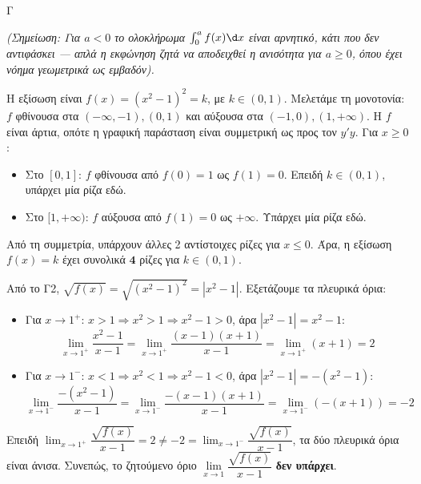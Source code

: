 \begin{thema}{Γ}
\begin{erwthma}
\textit{(Σημείωση: Για $a < 0$ το ολοκλήρωμα $\int_0^a f(x)\d x$ είναι αρνητικό, κάτι που δεν αντιφάσκει — απλά η εκφώνηση ζητά να αποδειχθεί η ανισότητα για $a \ge 0$, όπου έχει νόημα γεωμετρικά ως εμβαδόν).}

\item Η εξίσωση είναι $f(x) = (x^2-1)^2 = k$, με $k \in (0, 1)$.
Μελετάμε τη μονοτονία: $f$ φθίνουσα στα $(-\infty,-1), (0,1)$ και αύξουσα στα $(-1,0), (1,+\infty)$.
Η $f$ είναι άρτια, οπότε η γραφική παράσταση είναι συμμετρική ως προς τον $y'y$.
Για $x \ge 0$:
\begin{itemize}
    \item Στο $[0,1]$: $f$ φθίνουσα από $f(0)=1$ ως $f(1)=0$. Επειδή $k \in (0,1)$, υπάρχει μία ρίζα εδώ.
    \item Στο $[1,+\infty)$: $f$ αύξουσα από $f(1)=0$ ως $+\infty$. Υπάρχει μία ρίζα εδώ.
\end{itemize}
Από τη συμμετρία, υπάρχουν άλλες 2 αντίστοιχες ρίζες για $x \le 0$.
Άρα, η εξίσωση $f(x) = k$ έχει συνολικά $\boldsymbol{4}$ ρίζες για $k \in (0,1)$.

\item Από το Γ2, $\sqrt{f(x)} = \sqrt{(x^2-1)^2} = |x^2-1|$.
Εξετάζουμε τα πλευρικά όρια:
\begin{itemize}
    \item Για $x \to 1^+$: $x > 1 \Rightarrow x^2 > 1 \Rightarrow x^2-1 > 0$, άρα $|x^2-1| = x^2-1$:
    \[ \lim_{x \to 1^+} \frac{x^2-1}{x-1} = \lim_{x \to 1^+} \frac{(x-1)(x+1)}{x-1} = \lim_{x \to 1^+} (x+1) = 2 \]
    \item Για $x \to 1^-$: $x < 1 \Rightarrow x^2 < 1 \Rightarrow x^2-1 < 0$, άρα $|x^2-1| = -(x^2-1)$:
    \[ \lim_{x \to 1^-} \frac{-(x^2-1)}{x-1} = \lim_{x \to 1^-} \frac{-(x-1)(x+1)}{x-1} = \lim_{x \to 1^-} (-(x+1)) = -2 \]
\end{itemize}
Επειδή $\lim_{x \to 1^+} \dfrac{\sqrt{f(x)}}{x-1} = 2 \neq -2 = \lim_{x \to 1^-} \dfrac{\sqrt{f(x)}}{x-1}$, τα δύο πλευρικά όρια είναι άνισα.
Συνεπώς, το ζητούμενο όριο $\lim\limits_{x \to 1} \dfrac{\sqrt{f(x)}}{x-1}$ \textbf{δεν υπάρχει}.
\end{erwthma}
\end{thema}

